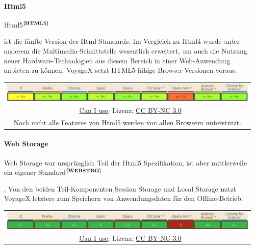 \paragraph{Html5}
Html5$^{\textbf{\ref{HTML5}}}$%
\addtocounter{footnote}{1}%
ist die fünfte Version des Html Standards. Im Vergleich zu Html4 wurde unter anderem die Multimedia-Schnittstelle wesentlich erweitert, um auch die Nutzung neuer Hardware-Technologien aus diesem Bereich in einer Web-Anwendung anbieten zu können. VoyageX setzt HTML5-fähige Browser-Versionen voraus. 
	\begin{table}[H]
  		\begin{adjustwidth}{-1.5cm}{1.5cm}
		\centering
		\begin{tabulary}{20cm}{C}
	  		\includegraphics[scale=0.6]{bilder/screenshots/caniuse_html5.png}\\ 
				\ccLogo\ 
				\begingroup
    				\fontsize{8pt}{12pt}\selectfont
    				\href{http://caniuse.com/\#search=html5}{Can I use}; Lizenz: \href{http://creativecommons.org/licenses/by-nc/3.0/}{CC BY-NC 3.0} 
				\endgroup\\ 
	  		Noch nicht alle Features von Html5 werden von allen Browsern unterstützt.
		\end{tabulary}
  		\end{adjustwidth}
	\end{table}

\paragraph{Web Storage}
Web Storage war ursprünglich Teil der Html5 Spezifikation, ist aber mittlerweile ein eigener Standard$^{\textbf{\ref{WEBSTRG}}}$%
\addtocounter{footnote}{1}%
. Von den beiden Teil-Komponenten Session Storage und Local Storage nutzt VoyageX letztere zum Speichern von Anwendungsdaten für den Offline-Betrieb.
	\begin{table}[H]
  		\begin{adjustwidth}{-1.5cm}{1.5cm}
		\centering
		\begin{tabulary}{20cm}{C}
	  		\includegraphics[scale=0.6]{bilder/screenshots/caniuse_webstorage.png}\\ 
				\ccLogo\ 
				\begingroup
    				\fontsize{8pt}{12pt}\selectfont
    				\href{http://caniuse.com/\#search=webstorage}{Can I use}; Lizenz: \href{http://creativecommons.org/licenses/by-nc/3.0/}{CC BY-NC 3.0} 
				\endgroup
		\end{tabulary}
  		\end{adjustwidth}
	\end{table}

